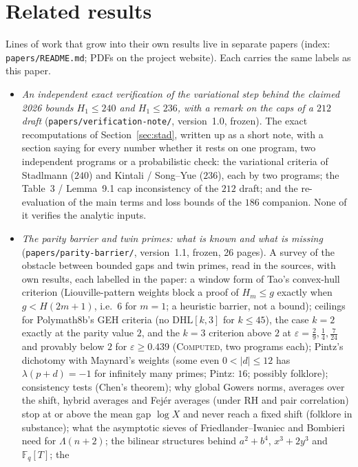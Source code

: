 \documentclass[11pt]{amsart}
\theoremstyle{definition}
\theoremstyle{remark}
\newcommand{\lbl}[1]{\textup{\textsc{#1}}}
\begin{document}
\section{Related results}\label{sec:related}
\begin{sloppypar}
Lines of work that grow into their own results live in separate papers
(index: \texttt{papers/README.md}; PDFs on the project website). Each carries the
same labels as this paper.
\begin{itemize}
\item \emph{An independent exact verification of the variational step behind
the claimed 2026 bounds $H_1\le240$ and $H_1\le236$, with a remark on the caps
of a $212$ draft} (\texttt{papers/verification-note/}, version~1.0, frozen).
The exact recomputations of Section~\ref{sec:stad}, written up as a short note,
with a section saying for every number whether it rests on one program, two
independent programs or a probabilistic check: the
variational criteria of Stadlmann ($240$) and Kintali / Song--Yue ($236$), each
by two programs; the Table~3 / Lemma~9.1 cap inconsistency of the $212$ draft;
and the re-evaluation of the main terms and loss bounds of the $186$ companion.
None of it verifies the analytic inputs.
\item \emph{The parity barrier and twin primes: what is known and what is
missing} (\texttt{papers/parity-barrier/}, version~1.1, frozen, 26 pages). A
survey of the obstacle between bounded gaps and twin primes, read in the
sources, with own results, each labelled in the paper: a window form of Tao's
convex-hull criterion (Liouville-pattern weights block a proof of $H_m\le g$
exactly when $g<H(2m+1)$, i.e.\ $6$ for $m=1$; a heuristic barrier, not a
bound); ceilings for Polymath8b's GEH criteria (no $\mathrm{DHL}[k,3]$ for
$k\le45$), the case $k=2$ exactly at the parity value $2$, and the $k=3$
criterion above $2$ at $\varepsilon=\frac29,\frac14,\frac7{24}$ and provably below $2$ for
$\varepsilon\ge0.439$ (\lbl{Computed}, two programs each); Pintz's dichotomy with
Maynard's weights (some even $0<|d|\le12$ has $\lambda(p+d)=-1$ for infinitely
many primes; Pintz: $16$; possibly folklore); consistency tests (Chen's
theorem); why global Gowers norms, averages over the shift, hybrid averages
and Fej\'er averages (under RH and pair correlation) stop at or above the mean
gap $\log X$ and never reach a fixed shift (folklore in substance); what the
asymptotic sieves of Friedlander--Iwaniec and Bombieri need for $\Lambda(n+2)$;
the bilinear structures behind $a^2+b^4$, $x^3+2y^3$ and $\mathbb F_q[T]$; the

\end{itemize}
\end{sloppypar}
\end{document}
